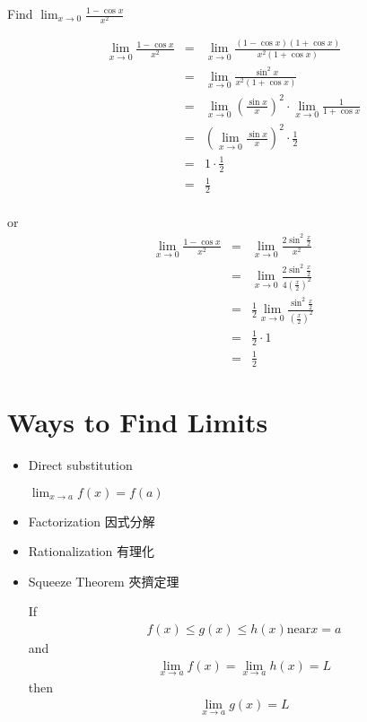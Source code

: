 \begin{eg}{}
Find $\displaystyle \lim_{x \to 0} \frac{1- \cos x}{x^2}$

$$\begin{array}{rcl}
\displaystyle \lim_{x \to 0} \frac{1 - \cos x}{x^2} & = & \displaystyle \lim_{x \to 0} \frac{(1 -\cos x)(1 + \cos x)}{x^2 (1 + \cos x)}\\
& = & \displaystyle  \lim_{x \to 0} \frac{\sin ^2 x}{x^2 (1 + \cos x)}\\
& = & \displaystyle \lim_{x \to 0} (\frac{\sin x}{x})^2 \cdot \lim_{x \to 0} \frac{1}{1+\cos x}\\
& = & \displaystyle (\lim_{x \to 0} \frac{\sin x}{x})^2 \cdot \frac{1}{2}\\
& = & \displaystyle 1 \cdot \frac{1}{2}\\
& = & \displaystyle \frac{1}{2}
\end{array}$$\\
or
$$\begin{array}{rcl}
\displaystyle \lim_{x \to 0} \frac{1 - \cos x}{x^2} & = & \displaystyle \lim_{x \to 0} \frac{2\sin ^2 \frac{x}{2}}{x^2}\\
& = & \displaystyle \lim_{x \to 0} \frac{2\sin ^2 \frac{x}{2}}{4(\frac{x}{2})^2}\\
& = & \displaystyle \frac{1}{2} \lim_{x \to 0} \frac{\sin ^2 \frac{x}{2}}{(\frac{x}{2})^2}\\
&= & \displaystyle \frac{1}{2} \cdot 1\\
& = & \displaystyle \frac{1}{2}
\end{array}$$
\end{eg}

\section{Ways to Find Limits}
\begin{itemize}
\item Direct substitution

$\displaystyle \lim_{x \to a} f(x) = f(a)$
\item Factorization 因式分解
\item Rationalization  有理化
\item Squeeze Theorem 夾擠定理
\begin{theorem}
If 
\begin{align*}
f(x) \leq g(x) \leq h(x) \text{near} x = a
\end{align*}
and 
\begin{align*}
\displaystyle \lim_{x \to a} f(x) = \lim_{x \to a} h(x) = L
\end{align*} 
then 
\begin{align*}
\displaystyle \lim_{x \to a} g(x) = L
\end{align*}
\end{theorem}
\end{itemize}


